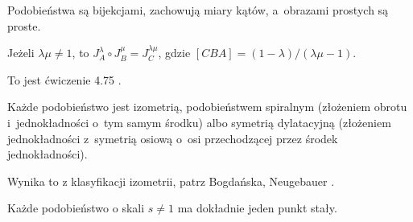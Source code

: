 Podobieństwa są bijekcjami, zachowują miary kątów, a~obrazami prostych są proste.

\begin{proposition}
    Jeżeli $\lambda \mu \neq 1$, to $J_A^\lambda \circ J_B^\mu = J_C^{\lambda \mu}$, gdzie $[CBA] = (1-\lambda) / (\lambda \mu - 1)$.
\end{proposition}

To jest ćwiczenie 4.75 \cite[s. 217]{neugebauer_2018}.

\begin{proposition}
    Każde podobieństwo jest izometrią, podobieństwem spiralnym (złożeniem obrotu i~jednokładności o~tym samym środku) albo symetrią dylatacyjną (złożeniem jednokładności z~symetrią osiową o~osi przechodzącej przez środek jednokładności).
\end{proposition}

Wynika to z klasyfikacji izometrii, patrz Bogdańska, Neugebauer \cite[s. 220]{neugebauer_2018}.

\begin{proposition}
    Każde podobieństwo o skali $s \neq 1$ ma dokładnie jeden punkt stały.
\end{proposition}


%
